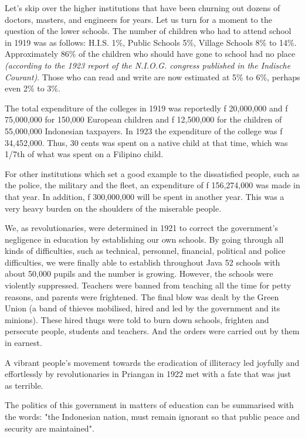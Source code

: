 Let's skip over the higher institutions that have been churning out dozens of doctors, masters, 
and engineers for years. Let us turn for a moment to the question of the lower schools. 
The number of children who had to attend school in 1919 was as follows: H.I.S. 1\%, 
Public Schools 5\%, Village Schools 8\% to 14\%. Approximately 86\% of the children 
who should have gone to school had no place \emph{(according to the 1923 report of the 
N.I.O.G. congress published in the Indische Courant)}. Those who can read and write 
are now estimated at 5\% to 6\%, perhaps even 2\% to 3\%.\vskip 0.2in

The total expenditure of the colleges in 1919 was reportedly f 20,000,000 and f 75,000,000 
for 150,000 European children and f 12,500,000 for the children of 55,000,000 Indonesian 
taxpayers. In 1923 the expenditure of the college was f 34,452,000. Thus, 30 cents was 
spent on a native child at that time, which was 1/7th of what was spent on a Filipino child.\vskip 0.2in

For other institutions which set a good example to the dissatisfied people, such as the police, 
the military and the fleet, an expenditure of f 156,274,000 was made in that year. In addition, 
f 300,000,000 will be spent in another year. This was a very heavy burden on the shoulders of the miserable people.\vskip 0.2in

We, as revolutionaries, were determined in 1921 to correct the government's negligence 
in education by establishing our own schools. By going through all kinds of difficulties, 
such as technical, personnel, financial, political and police difficulties, we were finally 
able to establish throughout Java 52 schools with about 50,000 pupils and the number is growing. 
However, the schools were violently suppressed. Teachers were banned from teaching all the 
time for petty reasons, and parents were frightened. The final blow was dealt by the Green 
Union (a band of thieves mobilised, hired and led by the government and its minions). 
These hired thugs were told to burn down schools, frighten and persecute people, students 
and teachers. And the orders were carried out by them in earnest.\vskip 0.2in

A vibrant people's movement towards the eradication of illiteracy led joyfully and effortlessly 
by revolutionaries in Priangan in 1922 met with a fate that was just as terrible.\vskip 0.2in

The politics of this government in matters of education can be summarised with the words: 
"the Indonesian nation, must remain ignorant so that public peace and security are maintained".\vskip 0.2in

